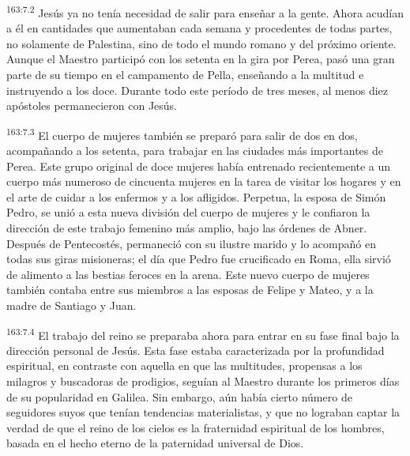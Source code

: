 \par 
\textsuperscript{163:7.2} Jesús ya no tenía necesidad de salir para enseñar a la gente. Ahora acudían a él en cantidades que aumentaban cada semana y procedentes de todas partes, no solamente de Palestina, sino de todo el mundo romano y del próximo oriente. Aunque el Maestro participó con los setenta en la gira por Perea, pasó una gran parte de su tiempo en el campamento de Pella, enseñando a la multitud e instruyendo a los doce. Durante todo este período de tres meses, al menos diez apóstoles permanecieron con Jesús.

\par 
\textsuperscript{163:7.3} El cuerpo de mujeres también se preparó para salir de dos en dos, acompañando a los setenta, para trabajar en las ciudades más importantes de Perea. Este grupo original de doce mujeres había entrenado recientemente a un cuerpo más numeroso de cincuenta mujeres en la tarea de visitar los hogares y en el arte de cuidar a los enfermos y a los afligidos. Perpetua, la esposa de Simón Pedro, se unió a esta nueva división del cuerpo de mujeres y le confiaron la dirección de este trabajo femenino más amplio, bajo las órdenes de Abner. Después de Pentecostés, permaneció con su ilustre marido y lo acompañó en todas sus giras misioneras; el día que Pedro fue crucificado en Roma, ella sirvió de alimento a las bestias feroces en la arena. Este nuevo cuerpo de mujeres también contaba entre sus miembros a las esposas de Felipe y Mateo, y a la madre de Santiago y Juan.

\par 
\textsuperscript{163:7.4} El trabajo del reino se preparaba ahora para entrar en su fase final bajo la dirección personal de Jesús. Esta fase estaba caracterizada por la profundidad espiritual, en contraste con aquella en que las multitudes, propensas a los milagros y buscadoras de prodigios, seguían al Maestro durante los primeros días de su popularidad en Galilea. Sin embargo, aún había cierto número de seguidores suyos que tenían tendencias materialistas, y que no lograban captar la verdad de que el reino de los cielos es la fraternidad espiritual de los hombres, basada en el hecho eterno de la paternidad universal de Dios.